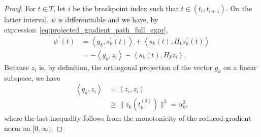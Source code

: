 \documentclass{article}
\numberwithin{equation}{section}
\newcommand{\inner}[2]{\left\langle {#1} , {#2} \right\rangle} %
\theoremstyle{plain}
\begin{document}
	\begin{proof}
		For $t \in T$, let $i$ be the breakpoint index such that $t\in(t_i,t_{i+1})$. On the latter interval, $\psi$ is differentiable and we have, by expression~\eqref{eq:projected_gradient_path_full_expr},
		\begin{equation*}
			\begin{split}
				\psi^\prime(t) & = \inner{g_k}{s_k^\prime(t)} + \inner{s_k(t)}{H_ks_k^\prime(t)} \\
				& = -\inner{g_k}{z_i} - \inner{s_k(t)}{H_kz_i}.
			\end{split}
		\end{equation*}
		Because $z_i$ is, by definition, the orthogonal projection of the vector $g_k$ on a linear subspace, we have
		\begin{equation}\label{eq:ineq_derivative_model_first_order}
			\begin{split}
				\inner{g_k}{z_i} & = \inner{z_i}{z_i} \\
				& \ge \|z_k(t_k^{(3)})\|^2 = \alpha_k^2,
			\end{split}
		\end{equation}
		where the last inequality follows from the monotonicity of the reduced gradient norm on $[0,\infty)$. 
		

\end{proof}
\end{document}
